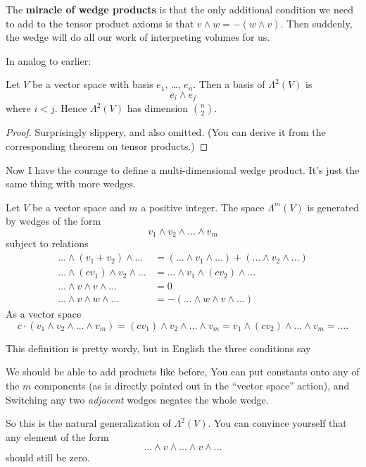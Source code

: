 The \textbf{miracle of wedge products} is that the only additional condition
we need to add to the tensor product axioms is that $v \wedge w = -(w \wedge v)$.
Then suddenly, the wedge will do all our work of interpreting volumes for us.

In analog to earlier:
\begin{proposition}
	Let $V$ be a vector space
	with basis $e_1$, \dots, $e_n$.
	Then a basis of $\Lambda^2(V)$ is
	\[ e_i \wedge e_j \]
	where $i < j$.
	Hence $\Lambda^2(V)$ has dimension $\binom n2$.
\end{proposition}
\begin{proof}
	Surprisingly slippery, and also omitted.
	(You can derive it from the corresponding theorem on tensor products.)
\end{proof}

Now I have the courage to define a multi-dimensional wedge product.
It's just the same thing with more wedges.
\begin{definition}
	Let $V$ be a vector space and $m$ a positive integer.
	The space $\Lambda^m(V)$ is generated by wedges of the form
	\[ v_1 \wedge v_2 \wedge \dots \wedge v_m \]
	subject to relations
	\begin{align*}
		\dots \wedge (v_1+v_2) \wedge \dots
			&= (\dots \wedge v_1 \wedge \dots)
			 + (\dots \wedge v_2 \wedge \dots) \\
		\dots \wedge (cv_1) \wedge v_2 \wedge \dots
			&= \dots \wedge v_1 \wedge (cv_2) \wedge \dots  \\
		\dots \wedge v \wedge v \wedge \dots &= 0 \\
		\dots \wedge v \wedge w \wedge \dots &=
			- (\dots \wedge w \wedge v \wedge \dots)
	\end{align*}
	As a vector space
	\[ c \cdot (v_1 \wedge v_2 \wedge \dots \wedge v_m)
	 = (cv_1) \wedge v_2 \wedge \dots \wedge v_m
	 = v_1 \wedge (cv_2) \wedge \dots \wedge v_m
	 = \dots .
	\]
\end{definition}
This definition is pretty wordy, but in English the three conditions say
\begin{itemize}
	\ii We should be able to add products like before,
	\ii You can put constants onto any of the $m$ components
	(as is directly pointed out in the ``vector space'' action), and
	\ii Switching any two \emph{adjacent} wedges negates the whole wedge.
\end{itemize}
So this is the natural generalization of $\Lambda^2(V)$.
You can convince yourself that any element of the form
\[ \dots \wedge v \wedge \dots \wedge v \wedge \dots \]
should still be zero.

